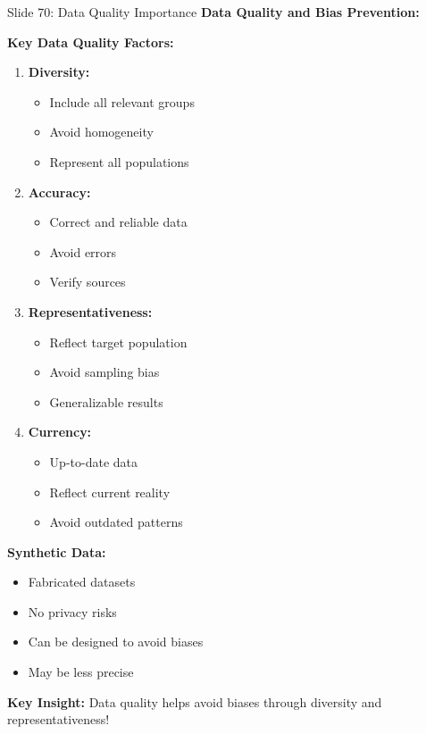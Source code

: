 \documentclass[8pt]{beamer}
\begin{document}
	\begin{frame}{Slide 70: Data Quality Importance}
		\fontsize{6.5}{7.5}\selectfont
		\textbf{Data Quality and Bias Prevention:}
		
		\vspace{0.1cm}
		\textbf{Key Data Quality Factors:}
		\begin{enumerate}
			\item \textbf{Diversity:}
			\begin{itemize}
				\item Include all relevant groups
				\item Avoid homogeneity
				\item Represent all populations
			\end{itemize}
			\item \textbf{Accuracy:}
			\begin{itemize}
				\item Correct and reliable data
				\item Avoid errors
				\item Verify sources
			\end{itemize}
			\item \textbf{Representativeness:}
			\begin{itemize}
				\item Reflect target population
				\item Avoid sampling bias
				\item Generalizable results
			\end{itemize}
			\item \textbf{Currency:}
			\begin{itemize}
				\item Up-to-date data
				\item Reflect current reality
				\item Avoid outdated patterns
			\end{itemize}
		\end{enumerate}
		
		\vspace{0.1cm}
		\textbf{Synthetic Data:}
		\begin{itemize}
			\item Fabricated datasets
			\item No privacy risks
			\item Can be designed to avoid biases
			\item May be less precise
		\end{itemize}
		
		\textcolor{myblue}{\textbf{Key Insight:}} Data quality helps \textcolor{myblue}{avoid biases} through diversity and representativeness!
	\end{frame}
	
\end{document}
